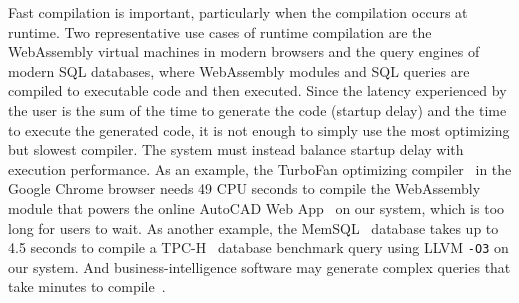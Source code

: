 \documentclass[acmsmall,nonacm,screen]{acmart}\settopmatter{printfolios=true,printccs=true,printacmref=false}
\newcommand{\othree}{\texttt{-O3}}
\begin{document}
Fast compilation is important, particularly when the compilation occurs at runtime. Two representative use cases of runtime compilation are the WebAssembly virtual machines in modern browsers and the query engines of modern SQL databases, where WebAssembly modules and SQL queries are compiled to executable code and then executed. Since the latency experienced by the user is the sum of the time to generate the code (startup delay) and the time to execute the generated code, it is not enough to simply use the most optimizing but slowest compiler. The system must instead balance startup delay with execution performance. As an example, the TurboFan optimizing compiler~\cite{liftoffBlog} in the Google Chrome browser needs 49 CPU seconds to compile the WebAssembly module that powers the online AutoCAD Web App~\cite{autocadWebApp} on our system, which is too long for users to wait. As another example, the MemSQL~\cite{memsql} database takes up to 4.5 seconds to compile a TPC-H~\cite{tpch} database benchmark query using LLVM \othree{} on our system. And business-intelligence software may generate complex queries that take minutes to compile~\cite{memsqlPersonalCommunication}.
\end{document}

